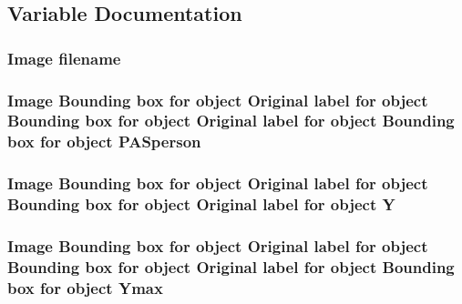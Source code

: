 \subsection{Variable Documentation}
\subsubsection[{\texorpdfstring{filename}{filename}}]{\setlength{\rightskip}{0pt plus 5cm}Image filename}\hypertarget{crop001001_8txt_a8fb7cd54abaa35f0affcd036288e33b1}{}\label{crop001001_8txt_a8fb7cd54abaa35f0affcd036288e33b1}
\subsubsection[{\texorpdfstring{P\+A\+Sperson}{PASperson}}]{\setlength{\rightskip}{0pt plus 5cm}Image Bounding box for object Original label for object Bounding box for object Original label for object Bounding box for object P\+A\+Sperson}\hypertarget{crop001001_8txt_a8237c2a8d218ae6baf323f28f0fd44e7}{}\label{crop001001_8txt_a8237c2a8d218ae6baf323f28f0fd44e7}
\subsubsection[{\texorpdfstring{Y}{Y}}]{\setlength{\rightskip}{0pt plus 5cm}Image Bounding box for object Original label for object Bounding box for object Original label for object Y}\hypertarget{crop001001_8txt_af3b1f3841810e39f13473ad32744a6c5}{}\label{crop001001_8txt_af3b1f3841810e39f13473ad32744a6c5}
\subsubsection[{\texorpdfstring{Ymax}{Ymax}}]{\setlength{\rightskip}{0pt plus 5cm}Image Bounding box for object Original label for object Bounding box for object Original label for object Bounding box for object Ymax}\hypertarget{crop001001_8txt_a5e09200f24fba566f16b31d5e57d6834}{}\label{crop001001_8txt_a5e09200f24fba566f16b31d5e57d6834}
